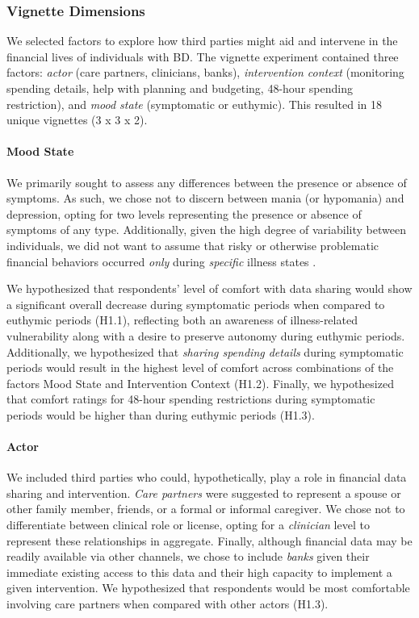 \documentclass[10pt]{article}
\begin{document}
\subsubsection{Vignette Dimensions}

We selected factors to explore how third parties might aid and intervene in the financial lives of individuals with BD. The vignette experiment contained three factors: \emph{actor} (care partners, clinicians, banks), \emph{intervention context} (monitoring spending details, help with planning and budgeting, 48-hour spending restriction), and \emph{mood state} (symptomatic or euthymic). This resulted in 18 unique vignettes (3 x 3 x 2).




\paragraph{Mood State}

We primarily sought to assess any differences between the presence or absence of symptoms. As such, we chose not to discern between mania (or hypomania) and depression, opting for two levels representing the presence or absence of symptoms of any type. Additionally, given the high degree of variability between individuals, we did not want to assume that risky or otherwise problematic financial behaviors occurred \emph{only} during \emph{specific} illness states \cite{richardsonfinancial2018}.

We hypothesized that respondents' level of comfort with data sharing would show a significant overall decrease during symptomatic periods when compared to euthymic periods (H1.1), reflecting both an awareness of illness-related vulnerability along with a desire to preserve autonomy during euthymic periods. Additionally, we hypothesized that \emph{sharing spending details} during symptomatic periods would result in the highest level of comfort across combinations of the factors Mood State and Intervention Context (H1.2). Finally, we hypothesized that comfort ratings for 48-hour spending restrictions during symptomatic periods would be higher than during euthymic periods (H1.3).


\paragraph{Actor}

We included third parties who could, hypothetically, play a role in financial data sharing and intervention. \emph{Care partners} were suggested to represent a spouse or other family member, friends, or a formal or informal caregiver. We chose not to differentiate between clinical role or license, opting for a \emph{clinician} level to represent these relationships in aggregate. Finally, although financial data may be readily available via other channels, we chose to include \emph{banks} given their immediate existing access to this data and their high capacity to implement a given intervention. We hypothesized that respondents would be most comfortable involving care partners when compared with other actors (H1.3).
\end{document}
